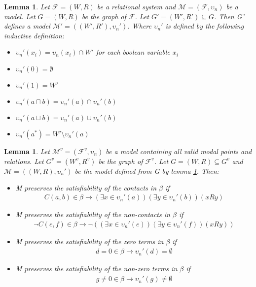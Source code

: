 \documentclass{article}
\newcommand\M{\mathcal{M}}
\newcommand\F{\mathcal{F}}
\newtheorem{lemma}[theorem]{Lemma}
\begin{document}
	\begin{lemma}\label{model-from-graph}
		Let $\F = (W, R)$ be a relational system and $\M = (\F, \upsilon_n)$ be a model. Let $G=(W, R)$ be the graph of $\F$. Let $G'=(W',R') \subseteq G$. Then G' defines a model $\M' = ((W', R'), \upsilon_n')$. Where $\upsilon_n'$ is defined by the following inductive definition:
		\begin{itemize}
			\item $\upsilon_n'(x_i) = \upsilon_n(x_i) \cap W'$ for each boolean variable $x_i$
			\item $\upsilon_n'(0) = \emptyset$
			\item $\upsilon_n'(1) = W'$
			\item $\upsilon_n'(a \sqcap b) = \upsilon_n'(a) \cap \upsilon_n'(b)$
			\item $\upsilon_n'(a \sqcup b) = \upsilon_n'(a) \cup \upsilon_n'(b)$
			\item $\upsilon_n'(a^*) = W' \setminus \upsilon_n'(a)$
		\end{itemize}
	\end{lemma}

	\begin{lemma}
		Let $\M^v = (\F^v, \upsilon_n)$ be a model containing all valid modal points and relations. Let $G^v=(W^v, R^v)$ be the graph of $\F^v$. Let $G=(W,R) \subseteq G^v$ and $\M=((W,R), \upsilon_n')$ be the model defined from G by lemma \ref{model-from-graph}. Then:
		\begin{itemize}
			\item M preserves the satisfiability of the contacts in $\beta$ if
			\begin{gather*}
				C(a,b) \in \beta \rightarrow (\exists x \in \upsilon_n'(a))(\exists y \in \upsilon_n'(b))(xRy)
			\end{gather*}

			\item M preserves the satisfiability of the non-contacts in $\beta$ if
			\begin{gather*}
				\neg C(e,f) \in \beta \rightarrow \neg ((\exists x \in \upsilon_n'(e))(\exists y \in \upsilon_n'(f))(xRy))
			\end{gather*}

			\item M preserves the satisfiability of the zero terms in $\beta$ if
			\begin{gather*}
				d = 0 \in \beta \rightarrow \upsilon_n'(d) = \emptyset
			\end{gather*}

			\item M preserves the satisfiability of the non-zero terms in $\beta$ if
			\begin{gather*}
				g \neq 0 \in \beta \rightarrow \upsilon_n'(g) \neq \emptyset
			\end{gather*}
		\end{itemize}
	\end{lemma}
\end{document}
